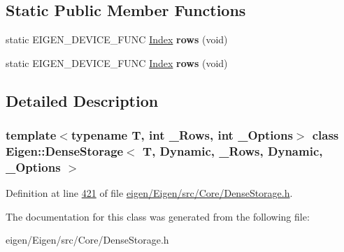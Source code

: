 \subsection*{Static Public Member Functions}
\begin{DoxyCompactItemize}
\item 
\mbox{\label{class_eigen_1_1_dense_storage_3_01_t_00_01_dynamic_00_01___rows_00_01_dynamic_00_01___options_01_4_a82629b531f76a7243c594c9e6d117a82}} 
static E\+I\+G\+E\+N\+\_\+\+D\+E\+V\+I\+C\+E\+\_\+\+F\+U\+NC \hyperlink{namespace_eigen_a62e77e0933482dafde8fe197d9a2cfde}{Index} {\bfseries rows} (void)
\item 
\mbox{\label{class_eigen_1_1_dense_storage_3_01_t_00_01_dynamic_00_01___rows_00_01_dynamic_00_01___options_01_4_a82629b531f76a7243c594c9e6d117a82}} 
static E\+I\+G\+E\+N\+\_\+\+D\+E\+V\+I\+C\+E\+\_\+\+F\+U\+NC \hyperlink{namespace_eigen_a62e77e0933482dafde8fe197d9a2cfde}{Index} {\bfseries rows} (void)
\end{DoxyCompactItemize}


\subsection{Detailed Description}
\subsubsection*{template$<$typename T, int \+\_\+\+Rows, int \+\_\+\+Options$>$\newline
class Eigen\+::\+Dense\+Storage$<$ T, Dynamic, \+\_\+\+Rows, Dynamic, \+\_\+\+Options $>$}



Definition at line \hyperlink{eigen_2_eigen_2src_2_core_2_dense_storage_8h_source_l00421}{421} of file \hyperlink{eigen_2_eigen_2src_2_core_2_dense_storage_8h_source}{eigen/\+Eigen/src/\+Core/\+Dense\+Storage.\+h}.



The documentation for this class was generated from the following file\+:\begin{DoxyCompactItemize}
\item 
eigen/\+Eigen/src/\+Core/\+Dense\+Storage.\+h\end{DoxyCompactItemize}
